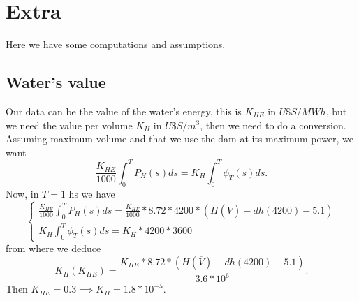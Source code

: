 \documentclass[12pt]{article}
\theoremstyle{definition}
\theoremstyle{remark}
\begin{document}


\section{Extra}

Here we have some computations and assumptions.

\subsection{Water's value}

Our data can be the value of the water's energy, this is $K_{HE}$ in $U\$S/MWh$, but we need the value per volume $K_H$ in $U\$S/m^3$, then we need to do a conversion. Assuming maximum volume and that we use the dam at its maximum power, we want
\begin{equation*}
\frac{K_{HE}}{1000}\int_0^TP_H(s)ds=K_H\int_0^T\phi_T(s)ds.
\end{equation*}
Now, in $T=1$ hs we have
\begin{equation*}
\begin{cases}
\frac{K_{HE}}{1000}\int_0^TP_H(s)ds=\frac{K_{HE}}{1000}*8.72*4200*(H(\overline{V})-dh(4200)-5.1)\\
K_H\int_0^T\phi_T(s)ds=K_H*4200*3600
\end{cases}
\end{equation*}
from where we deduce
\begin{equation*}
K_H(K_{HE})=\frac{K_{HE}*8.72*(H(\overline{V})-dh(4200)-5.1)}{3.6*10^6}.
\end{equation*}
Then $K_{HE}=0.3\implies K_H=1.8*10^{-5}$.
\end{document}
